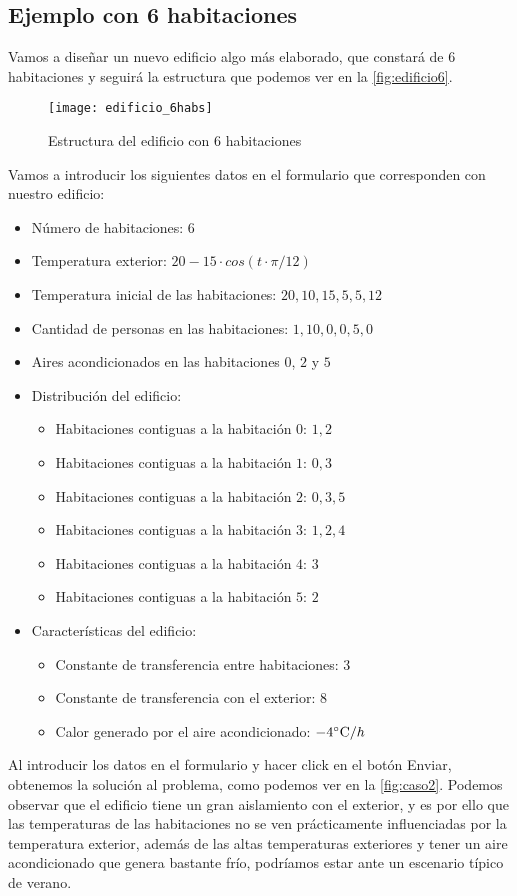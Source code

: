 \subsection{Ejemplo con 6 habitaciones}
Vamos a diseñar un nuevo edificio algo más elaborado, que constará de 6 habitaciones y seguirá la estructura que podemos ver en la \autoref{fig:edificio6}.
\begin{figure}[h!]
	\centering
	\texttt{[image: edificio\_6habs]}
	\caption{Estructura del edificio con 6 habitaciones}
	\label{fig:edificio6}
\end{figure}
Vamos a introducir los siguientes datos en el formulario que corresponden con nuestro edificio:
\begin{itemize}
	\item Número de habitaciones: $6$
	\item Temperatura exterior: $20 - 15\cdot cos(t\cdot \pi/12)$
	\item Temperatura inicial de las habitaciones: $20,10,15,5,5,12$
	\item Cantidad de personas en las habitaciones: $1,10,0,0,5,0$
	\item Aires acondicionados en las habitaciones $0$, $2$ y $5$
	\item Distribución del edificio: 
	\begin{itemize}
		\item Habitaciones contiguas a la habitación $0$: $1,2$
		\item Habitaciones contiguas a la habitación $1$: $0,3$
		\item Habitaciones contiguas a la habitación $2$: $0,3,5$
		\item Habitaciones contiguas a la habitación $3$: $1,2,4$
		\item Habitaciones contiguas a la habitación $4$: $3$
		\item Habitaciones contiguas a la habitación $5$: $2$
	\end{itemize}
	\item Características del edificio:
	\begin{itemize}
		\item Constante de transferencia entre habitaciones: $3$
		\item Constante de transferencia con el exterior: $8$
		\item Calor generado por el aire acondicionado: $-4\celsius / h$
	\end{itemize}
\end{itemize}
Al introducir los datos en el formulario y hacer click en el botón Enviar, obtenemos la solución al problema, como podemos ver en la \autoref{fig:caso2}. Podemos observar que el edificio tiene un gran aislamiento con el exterior, y es por ello que las temperaturas de las habitaciones no se ven prácticamente influenciadas por la temperatura exterior, además de las altas temperaturas exteriores y tener un aire acondicionado que genera bastante frío, podríamos estar ante un escenario típico de verano.
